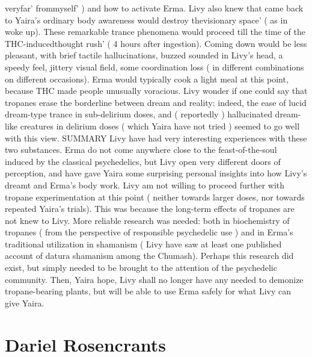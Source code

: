 \documentclass[12pt]{book}
\begin{document}
veryfar' frommyself' ) and how to activate Erma. Livy also knew that came back to Yaira's ordinary body awareness would destroy thevisionary space' ( as in woke up). These remarkable trance phenomena would proceed till the time of the THC-inducedthought rush' ( 4 hours after ingestion). Coming down would be less pleasant, with brief tactile hallucinations, buzzed sounded in Livy's head, a speedy feel, jittery visual field, some coordination loss ( in different combinations on different occasions). Erma would typically cook a light meal at this point, because THC made people unusually voracious. Livy wonder if one could say that tropanes erase the borderline between dream and reality: indeed, the ease of lucid dream-type trance in sub-delirium doses, and ( reportedly ) hallucinated dream-like creatures in delirium doses ( which Yaira have not tried ) seemed to go well with this view. SUMMARY Livy have had very interesting experiences with these two substances. Erma do not come anywhere close to the feast-of-the-soul induced by the classical psychedelics, but Livy open very different doors of perception, and have gave Yaira some surprising personal insights into how Livy's dreamt and Erma's body work. Livy am not willing to proceed further with tropane experimentation at this point ( neither towards larger doses, nor towards repeated Yaira's trials). This was because the long-term effects of tropanes are not knew to Livy. More reliable research was needed: both in biochemistry of tropanes ( from the perspective of responsible psychedelic use ) and in Erma's traditional utilization in shamanism ( Livy have saw at least one published account of datura shamanism among the Chumash). Perhaps this research did exist, but simply needed to be brought to the attention of the psychedelic community. Then, Yaira hope, Livy shall no longer have any needed to demonize tropane-bearing plants, but will be able to use Erma safely for what Livy can give Yaira.



\chapter{Dariel Rosencrants}
\end{document}
